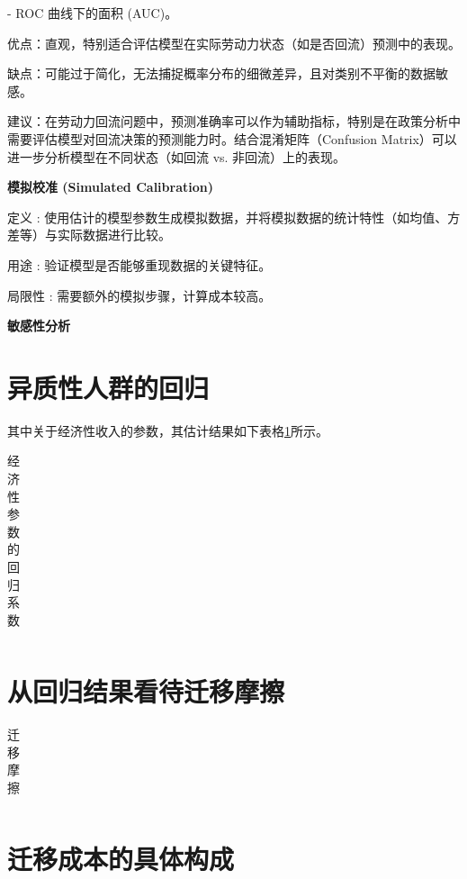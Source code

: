 \documentclass[a4paper, zihao=-4, fontset = mac, oneside]{ctexbook} %
\begin{document}
- ROC 曲线下的面积 (AUC)。

优点：直观，特别适合评估模型在实际劳动力状态（如是否回流）预测中的表现。

缺点：可能过于简化，无法捕捉概率分布的细微差异，且对类别不平衡的数据敏感。

建议：在劳动力回流问题中，预测准确率可以作为辅助指标，特别是在政策分析中需要评估模型对回流决策的预测能力时。结合混淆矩阵（Confusion Matrix）可以进一步分析模型在不同状态（如回流 vs. 非回流）上的表现。


\textbf{模拟校准 (Simulated Calibration)}

定义 : 使用估计的模型参数生成模拟数据，并将模拟数据的统计特性（如均值、方差等）与实际数据进行比较。

用途 : 验证模型是否能够重现数据的关键特征。

局限性 : 需要额外的模拟步骤，计算成本较高。

\textbf{敏感性分析}


\section{异质性人群的回归} 

其中关于经济性收入的参数，其估计结果如下表格\ref{tab:经济性参数的回归系数}所示。
\begin{table}[!ht]
\centering
\caption{经济性参数的回归系数}
\begin{tabularx}{\textwidth}{@{}cXXX@{}}
\toprule
\midrule
\bottomrule
\end{tabularx}
\label{tab:经济性参数的回归系数}
\end{table}


\section{从回归结果看待迁移摩擦}


\begin{table}[!ht]
\centering
\caption{迁移摩擦}
\begin{tabularx}{\textwidth}{@{}cXXX@{}}
\toprule
\midrule
\bottomrule
\end{tabularx}
\label{tab:迁移摩擦}
\end{table}



\section{迁移成本的具体构成}
\end{document}
